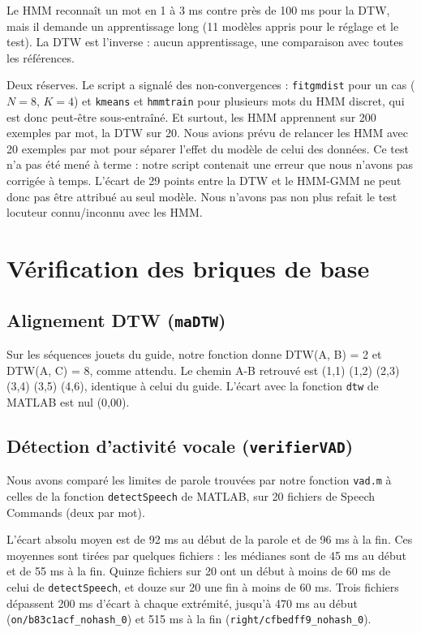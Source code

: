 Le HMM reconnaît un mot en 1 à 3 ms contre près de 100 ms pour la DTW, mais il demande un apprentissage long (11 modèles appris pour le réglage et le test). La DTW est l'inverse : aucun apprentissage, une comparaison avec toutes les références.

Deux réserves. Le script a signalé des non-convergences : \texttt{fitgmdist} pour un cas ($N = 8$, $K = 4$) et \texttt{kmeans} et \texttt{hmmtrain} pour plusieurs mots du HMM discret, qui est donc peut-être sous-entraîné. Et surtout, les HMM apprennent sur 200 exemples par mot, la DTW sur 20. Nous avions prévu de relancer les HMM avec 20 exemples par mot pour séparer l'effet du modèle de celui des données. Ce test n'a pas été mené à terme : notre script contenait une erreur que nous n'avons pas corrigée à temps. L'écart de 29 points entre la DTW et le HMM-GMM ne peut donc pas être attribué au seul modèle. Nous n'avons pas non plus refait le test locuteur connu/inconnu avec les HMM.

\section{Vérification des briques de base}

\subsection{Alignement DTW (\texttt{maDTW})}

Sur les séquences jouets du guide, notre fonction donne DTW(A, B) = 2 et DTW(A, C) = 8, comme attendu. Le chemin A-B retrouvé est (1,1) (1,2) (2,3) (3,4) (3,5) (4,6), identique à celui du guide. L'écart avec la fonction \texttt{dtw} de MATLAB est nul (0,00).

\subsection{Détection d'activité vocale (\texttt{verifierVAD})}

Nous avons comparé les limites de parole trouvées par notre fonction \texttt{vad.m} à celles de la fonction \texttt{detectSpeech} de MATLAB, sur 20 fichiers de Speech Commands (deux par mot).

L'écart absolu moyen est de 92 ms au début de la parole et de 96 ms à la fin. Ces moyennes sont tirées par quelques fichiers : les médianes sont de 45 ms au début et de 55 ms à la fin. Quinze fichiers sur 20 ont un début à moins de 60 ms de celui de \texttt{detectSpeech}, et douze sur 20 une fin à moins de 60 ms. Trois fichiers dépassent 200 ms d'écart à chaque extrémité, jusqu'à 470 ms au début (\texttt{on/b83c1acf\_nohash\_0}) et 515 ms à la fin (\texttt{right/cfbedff9\_nohash\_0}).

